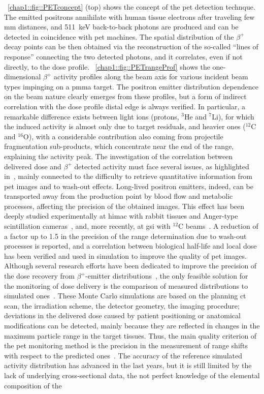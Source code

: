 \figurename~\ref{chap1::fig::PETconcept} (top) shows the concept of the \gls{pet} detection technque. The emitted positrons annihilate with human tissue electrons after traveling few mm distances, and 511~keV back-to-back photons are produced and can be detected in coincidence with \gls{pet} machines. The spatial distribution of the $\beta^+$ decay points can be then obtained via the reconstruction of the so-called \enquote{lines of response} connecting the two detected photons, and it correlates, even if not directly, to the dose profile. \figurename~\ref{chap1::fig::PETrangeProf} shows the one-dimensional $\beta^+$ activity profiles along the beam axis for various incident beam types impinging on a \gls{pmma} target. The positron emitter distribution dependence on the beam nature clearly emerges from these profiles, but a form of indirect correlation with the dose profile distal edge is always verified. In particular, a remarkable difference exists between light ions (protons, $^3$He and $^7$Li), for which the induced activity is almost only due to target residuals, and heavier ones ($^{12}$C and $^{16}$O), with a considerable contribution also coming from projectile fragmentation sub-products, which concentrate near the end of the range, explaining the activity peak. The investigation of the correlation between delivered dose and $\beta^+$ detected activity must face several issues, as highlighted in~\cite{Parodi2004}, mainly connected to the difficulty to retrieve quantitative information from \gls{pet} images and to wash-out effects. Long-lived positron emitters, indeed, can be transported away from the production point by blood flow and metabolic processes, affecting the precision of the obtained images. This effect has been deeply studied experimentally at \gls{himac} with rabbit tissues and Anger-type scintillation cameras~\parencite{Mizuno2003, Tomitani2003}, and, more recently, at \gls{gsi} with $^{12}$C beams~\parencite{Fiedler2008}. A reduction of a factor up to 1.5 in the precision of the range determination due to wash-out processes is reported, and a correlation between biological half-life and local dose has been verified and used in simulation to improve the quality of \gls{pet} images. Although several research efforts have been dedicated to improve the precision of the dose recovery from $\beta^+$-emitter distributions~\parencite{Parodi2006, Parodi2007, Parodi2010}, the only feasible solution for the monitoring of dose delivery is the comparison of measured distributions to simulated ones~\parencite{Ponish2004}. These Monte Carlo simulations are based on the planning \gls{ct} scan, the irradiation scheme, the detector geometry, the imaging procedure; deviations in the delivered dose caused by patient positioning or anatomical modifications can be detected, mainly because they are reflected in changes in the maximum particle range in the target tissues. Thus, the main quality criterion of the \gls{pet} monitoring method is the precision in the measurement of range shifts with respect to the predicted ones~\parencite{Fiedler2010}. The accuracy of the reference simulated activity distribution has advanced in the last years, but it is still limited by the lack of underlying cross-sectional data, the not perfect knowledge of the elemental composition of the 